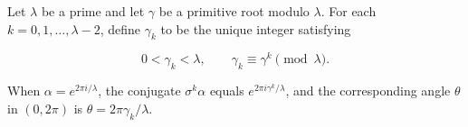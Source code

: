 Let $\lambda$ be a prime and let $\gamma$ be a primitive root modulo $\lambda$. For each $k = 0, 1, \dots, \lambda-2$, define $\gamma_k$ to be the unique integer satisfying

$$0 < \gamma_k < \lambda, \qquad \gamma_k \equiv \gamma^k \pmod{\lambda}.$$

When $\alpha = e^{2\pi i/\lambda}$, the conjugate $\sigma^k \alpha$ equals $e^{2\pi i \gamma^k/\lambda}$, and the corresponding angle $\theta$ in $(0, 2\pi)$ is $\theta = 2\pi \gamma_k / \lambda$.
